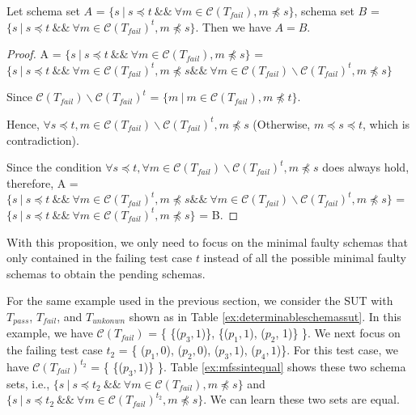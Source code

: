

\begin{proposition}\label{pro:mfssintequal}
Let schema set $A$ = $\{ s\ |\ s \preceq t\ \&\&\ \forall m \in \mathcal{C}(T_{fail}),  m \npreceq s \}$,  schema set $B$ = $\{ s\ |\ s \preceq t\ \&\&\ \forall m \in \mathcal{C}(T_{fail})^{t},  m \npreceq s \}$. Then we have $A = B$.
\end{proposition}

\begin{proof}

A = $\{ s\ |\  s \preceq t\ \&\&\ \forall m \in \mathcal{C}(T_{fail}),  m \npreceq s \}$
 =
$\{ s\ |\  s \preceq t\ \&\&\ \forall m \in \mathcal{C}(T_{fail})^{t},  m \npreceq s \&\&\   \forall m \in \mathcal{C}(T_{fail}) \backslash \mathcal{C}(T_{fail})^{t},  m \npreceq s  \}$

Since $\mathcal{C}(T_{fail}) \backslash \mathcal{C}(T_{fail})^{t}$ = $\{ m \ | \ m \in \mathcal{C}(T_{fail}), m \npreceq t \}$.

Hence, $\forall s \preceq t, m \in \mathcal{C}(T_{fail}) \backslash \mathcal{C}(T_{fail})^{t},  m \npreceq s$ (Otherwise, $m \preceq s \preceq t$, which is contradiction).

Since the condition $\forall s \preceq t, \forall m \in \mathcal{C}(T_{fail}) \backslash \mathcal{C}(T_{fail})^{t},  m \npreceq s $ does always hold, therefore, A =
$\{ s\ |\  s \preceq t\ \&\&\ \forall m \in \mathcal{C}(T_{fail})^{t},  m \npreceq s \&\&\   \forall m \in \mathcal{C}(T_{fail}) \backslash \mathcal{C}(T_{fail})^{t},  m \npreceq s  \}$  =
$\{ s\ |\  s \preceq t\ \&\&\ \forall m \in \mathcal{C}(T_{fail})^{t},  m \npreceq s \}$ = B.
\end{proof}

With this proposition, we only need to focus on the minimal faulty schemas that only contained in the failing test case $t$ instead of all the possible minimal faulty schemas to obtain the pending schemas. %

For the same example used in the previous section, we consider the SUT with $T_{pass}$, $T_{fail}$, and $T_{unkonwn}$ shown as in Table \ref{ex:determinableschemassut}. In this example, we have $\mathcal{C}(T_{fail})$ = \{ \{($p_{3}, 1$)\}, \{($p_{1}, 1$), ($p_{2}$, 1)\} \}. We next focus on the failing test case $t_{2}$ =  \{ ($p_{1}, 0$), ($p_{2}, 0$), ($p_{3}, 1$), ($p_{4}, 1$)\}. For this test case, we have $\mathcal{C}(T_{fail})^{t_{2}}$ = \{ \{($p_{3}, 1$)\} \}. Table \ref{ex:mfssintequal} shows these two schema sets, i.e., $\{ s\ |\  s \preceq t_{2}\ \&\&\ \forall m \in \mathcal{C}(T_{fail}),  m \npreceq s \}$ and $\{ s\ |\  s \preceq t_{2}\ \&\&\ \forall m \in \mathcal{C}(T_{fail})^{t_{2}},  m \npreceq s \}$. We can learn these two sets are equal.

